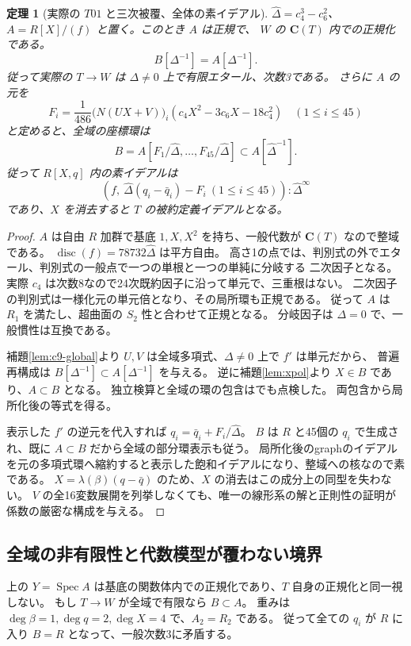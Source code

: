 \documentclass[11pt,a4paper]{ltjsarticle}
\newcommand{\CC}{\mathbf C}
\newtheorem{theorem}{定理}[section]
\theoremstyle{remark}
\begin{document}
\begin{theorem}[実際の $T01$ と三次被覆、全体の素イデアル]\label{thm:toric-affine-modification}
$\widehat\Delta=c_4^3-c_6^2$、$A=R[X]/(f)$ と置く。このとき $A$ は正規で、
$W$ の $\CC(T)$ 内での正規化である。
\[
 B[\Delta^{-1}]=A[\Delta^{-1}].
\]
従って実際の $T\to W$ は $\Delta\ne0$ 上で有限エタール、次数3である。
さらに $A$ の元を
\[
 F_i=\frac1{486}\bigl(N(UX+V)\bigr)_i
               (c_4X^2-3c_6X-18c_4^2)\quad(1\leq i\leq45)
\]
と定めると、全域の座標環は
\[
 B=A[F_1/\widehat\Delta,\ldots,F_{45}/\widehat\Delta]\subset A[\widehat\Delta^{-1}].
\]
従って $R[X,q]$ 内の素イデアルは
\[
 (f,\ \widehat\Delta(q_i-\bar q_i)-F_i\ (1\leq i\leq45)):
       \widehat\Delta^{\infty}
\]
であり、$X$ を消去すると $T$ の被約定義イデアルとなる。
\end{theorem}
\begin{proof}
$A$ は自由 $R$ 加群で基底 $1,X,X^2$ を持ち、一般代数が $\CC(T)$ なので整域である。
$\operatorname{disc}(f)=78732\widehat\Delta$ は平方自由。
高さ1の点では、判別式の外でエタール、判別式の一般点で一つの単根と一つの単純に分岐する
二次因子となる。実際 $c_4$ は次数8なので24次既約因子に沿って単元で、三重根はない。
二次因子の判別式は一様化元の単元倍となり、その局所環も正規である。
従って $A$ は $R_1$ を満たし、超曲面の $S_2$ 性と合わせて正規となる。
分岐因子は $\Delta=0$ で、一般慣性は互換である。

補題\ref{lem:c9-global}より $U,V$ は全域多項式、$\Delta\ne0$ 上で $f'$ は単元だから、
普遍再構成は $B[\Delta^{-1}]\subset A[\Delta^{-1}]$ を与える。
逆に補題\ref{lem:xpol}より $X\in B$ であり、$A\subset B$ となる。
独立検算と全域の環の包含は\cite{affine-modification-new}でも点検した。
両包含から局所化後の等式を得る。

表示した $f'$ の逆元を代入すれば $q_i=\bar q_i+F_i/\widehat\Delta$。
$B$ は $R$ と45個の $q_i$ で生成され、既に $A\subset B$ だから全域の部分環表示も従う。
局所化後のgraphのイデアルを元の多項式環へ縮約すると表示した飽和イデアルになり、整域への核なので素である。
$X=\lambda(\beta)(q-\bar q)$ のため、$X$ の消去はこの成分上の同型を失わない。
$V$ の全16変数展開を列挙しなくても、唯一の線形系の解と正則性の証明が係数の厳密な構成を与える。
\end{proof}

\subsection{全域の非有限性と代数模型が覆わない境界}
上の $Y=\operatorname{Spec}A$ は基底の関数体内での正規化であり、$T$ 自身の正規化と同一視しない。
もし $T\to W$ が全域で有限なら $B\subset A$。
重みは $\deg\beta=1,\deg q=2,\deg X=4$ で、$A_2=R_2$ である。
従って全ての $q_i$ が $R$ に入り $B=R$ となって、一般次数3に矛盾する。
\end{document}
